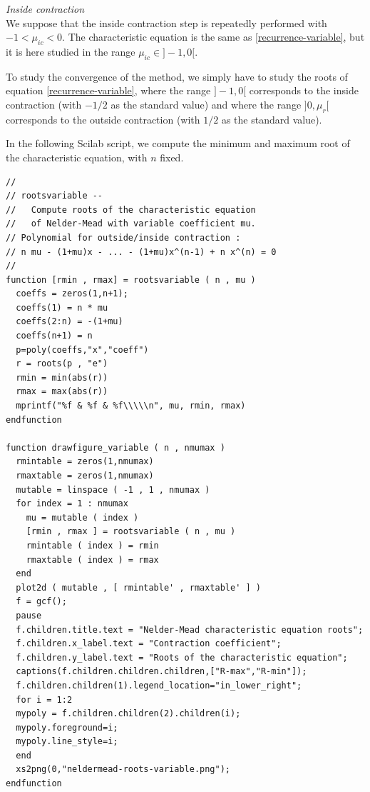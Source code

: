\emph{Inside contraction} \\
We suppose that the inside contraction step is repeatedly performed
with $-1 < \mu_{ic} < 0$. The characteristic equation is the same as \ref{recurrence-variable},
but it is here studied in the range $\mu_{ic}\in]-1, 0[$.

To study the convergence of the method, we simply have 
to study the roots of equation \ref{recurrence-variable}, where 
the range $]-1,0[$ corresponds to the inside contraction (with $-1/2$ 
as the standard value) and where the range $]0,\mu_r[$ corresponds to the outside contraction (with $1/2$ 
as the standard value).

In the following Scilab script, we compute the minimum and 
maximum root of the characteristic equation, with $n$ fixed.

\lstset{language=scilabscript}
\begin{lstlisting}
//
// rootsvariable --
//   Compute roots of the characteristic equation 
//   of Nelder-Mead with variable coefficient mu.
// Polynomial for outside/inside contraction :
// n mu - (1+mu)x - ... - (1+mu)x^(n-1) + n x^(n) = 0
//
function [rmin , rmax] = rootsvariable ( n , mu )
  coeffs = zeros(1,n+1);
  coeffs(1) = n * mu
  coeffs(2:n) = -(1+mu)
  coeffs(n+1) = n
  p=poly(coeffs,"x","coeff")
  r = roots(p , "e")
  rmin = min(abs(r))
  rmax = max(abs(r))
  mprintf("%f & %f & %f\\\\\n", mu, rmin, rmax)
endfunction

function drawfigure_variable ( n , nmumax )
  rmintable = zeros(1,nmumax)
  rmaxtable = zeros(1,nmumax)
  mutable = linspace ( -1 , 1 , nmumax ) 
  for index = 1 : nmumax
    mu = mutable ( index )
    [rmin , rmax ] = rootsvariable ( n , mu )
    rmintable ( index ) = rmin
    rmaxtable ( index ) = rmax
  end
  plot2d ( mutable , [ rmintable' , rmaxtable' ] )
  f = gcf();
  pause
  f.children.title.text = "Nelder-Mead characteristic equation roots";
  f.children.x_label.text = "Contraction coefficient";
  f.children.y_label.text = "Roots of the characteristic equation";
  captions(f.children.children.children,["R-max","R-min"]);
  f.children.children(1).legend_location="in_lower_right";
  for i = 1:2
  mypoly = f.children.children(2).children(i);
  mypoly.foreground=i;
  mypoly.line_style=i;
  end
  xs2png(0,"neldermead-roots-variable.png");
endfunction

\end{lstlisting}

